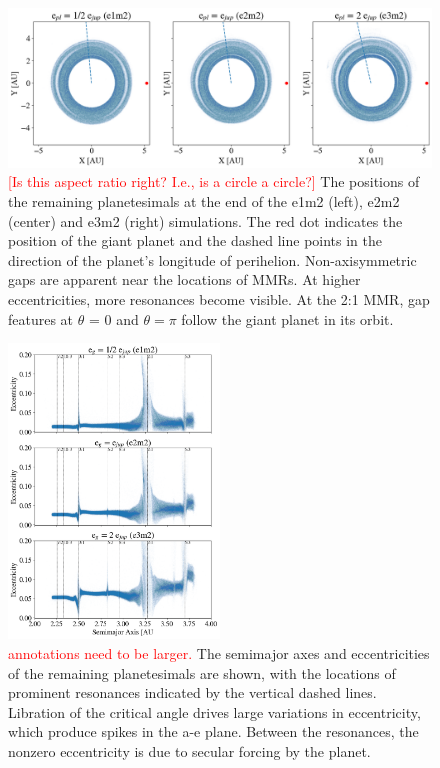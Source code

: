 \documentclass[twocolumn]{aastex63}
\newcommand{\ACBc}[1]{\textcolor{red}{#1}}
\begin{document}
\begin{figure}
\begin{center}
    \includegraphics[width=\textwidth]{figures/xy.png}
    \caption{\ACBc{[Is this aspect ratio right? I.e., is a circle a circle?]}  The positions of the remaining planetesimals at the end of the e1m2 (left), e2m2 (center) and e3m2 (right) simulations. The red dot 
    indicates the position of the giant planet and the dashed line points in the direction of the planet's longitude of perihelion. Non-axisymmetric gaps 
    are apparent near the locations of MMRs. At higher eccentricities, more resonances become visible. At the 2:1 MMR, gap features at $\theta$ = 0 
    and $\theta = \pi$ follow the giant planet in its orbit.\label{fig:xy}}
\end{center}
\end{figure}

\begin{figure}
\begin{center}
    \includegraphics[width=0.5\textwidth]{figures/ae.png}
    \caption{\ACBc{annotations need to be larger.}  The semimajor axes and eccentricities of the remaining planetesimals are shown, with the locations of prominent resonances indicated 
    by the vertical dashed lines. Libration of the critical angle drives large variations in eccentricity, which produce spikes in the a-e plane. Between 
    the resonances, the nonzero eccentricity is due to secular forcing by the planet.\label{fig:ae}}
\end{center}
\end{figure}
\end{document}
